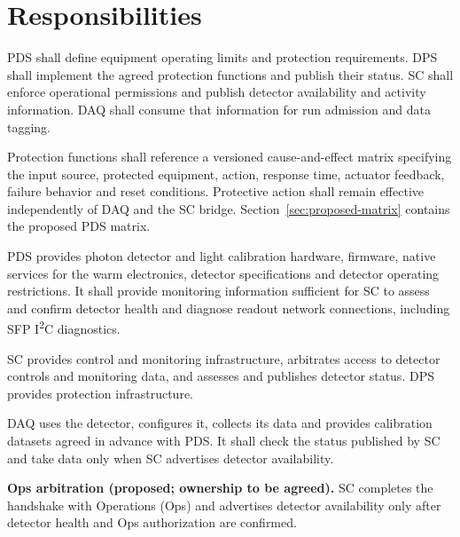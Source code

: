 \section{Responsibilities}

PDS shall define equipment operating limits and protection requirements.
DPS shall implement the agreed protection functions and publish their status.
SC shall enforce operational permissions and publish detector availability and
activity information. DAQ shall consume that information for run admission and
data tagging.

Protection functions shall reference a versioned cause-and-effect matrix
specifying the input source, protected equipment, action, response time,
actuator feedback, failure behavior and reset conditions. Protective action
shall remain effective independently of DAQ and the SC bridge.
Section~\ref{sec:proposed-matrix} contains the proposed PDS matrix.

PDS provides photon detector and light calibration hardware, firmware, native
services for the warm electronics, detector specifications and detector operating restrictions. It shall
provide monitoring information sufficient for SC to assess and confirm detector
health and diagnose readout network connections, including SFP
I\textsuperscript{2}C diagnostics.

SC provides control and monitoring infrastructure, arbitrates access to detector
controls and monitoring data, and assesses and publishes detector status.
DPS provides protection infrastructure.

DAQ uses the detector, configures it, collects its data and provides calibration
datasets agreed in advance with PDS. It shall check the status published by SC
and take data only when SC advertises detector availability.

\textbf{Ops arbitration (proposed; ownership to be agreed).} SC completes the
handshake with Operations (Ops) and advertises detector availability only after
detector health and Ops authorization are confirmed.

